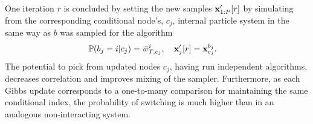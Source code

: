 %
One \mcmc iteration $r$ is concluded by setting the new samples $\mathbf{x}_{1:P}'[r]$ by simulating from the corresponding conditional node's, $c_j$, internal particle system in the same way as $b$ was sampled for the \pg algorithm
\begin{align}
\label{eq:simTrajectory}
\Prb(b_j = i | c_j) &= \nw_{T,c_j}^i, \quad %
\xb_j'[r] = \xb_{c_j}^{b_j}.
\end{align}
The potential to pick from updated nodes $c_j$, having run independent \smc algorithms, decreases correlation and improves mixing of the  \mcmc sampler. Furthermore, as each Gibbs update corresponds to a one-to-many comparison for maintaining the same conditional index, the probability of switching is much higher than in an analogous non-interacting system.

